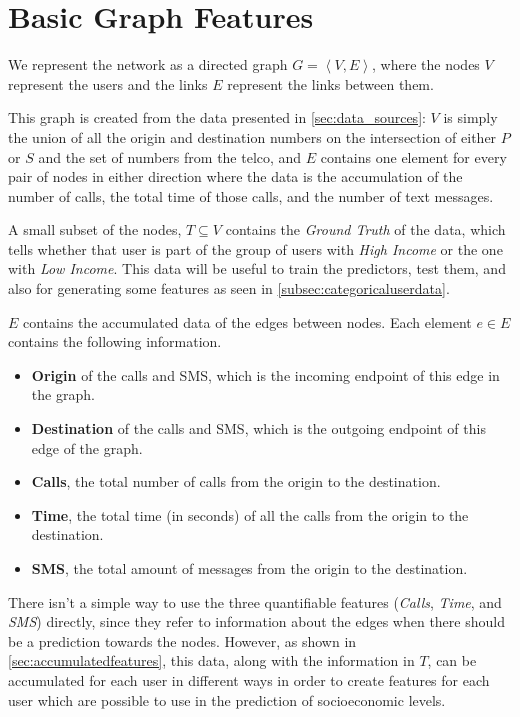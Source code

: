 \section{Basic Graph Features}
\label{sec:graphfeatures}

We represent the network as a directed graph $G = \left< V, E \right>$, where the nodes $V$ represent the users and the links $E$ represent the links between them.

This graph is created from the data presented in \cref{sec:data_sources}: $V$ is simply the union of all the origin and destination numbers on the intersection of either $P$ or $S$ and the set of numbers from the telco, and $E$ contains one element for every pair of nodes in either direction where the data is the accumulation of the number of calls, the total time of those calls, and the number of text messages.


A small subset of the nodes, $T \subseteq V$ contains the \emph{Ground Truth} of the data, which tells whether that user is part of the group of users with \emph{High Income} or the one with \emph{Low Income}. This data will be useful to train the predictors, test them, and also for generating some features as seen in \cref{subsec:categoricaluserdata}.

$E$ contains the accumulated data of the edges between nodes. Each element $e \in E$ contains the following information.

\begin{itemize}
	\item \textbf{Origin} of the calls and SMS, which is the incoming endpoint of this edge in the graph.
	\item \textbf{Destination} of the calls and SMS, which is the outgoing endpoint of this edge of the graph.
	\item \textbf{Calls}, the total number of calls from the origin to the destination.
	\item \textbf{Time}, the total time (in seconds) of all the calls from the origin to the destination.
	\item \textbf{SMS}, the total amount of messages from the origin to the destination.
\end{itemize}

There isn't a simple way to use the three quantifiable features (\emph{Calls}, \emph{Time}, and \emph{SMS}) directly, since they refer to information about the edges when there should be a prediction towards the nodes. However, as shown in \cref{sec:accumulatedfeatures}, this data, along with the information in $T$, can be accumulated for each user in different ways in order to create features for each user which are possible to use in the prediction of socioeconomic levels.

